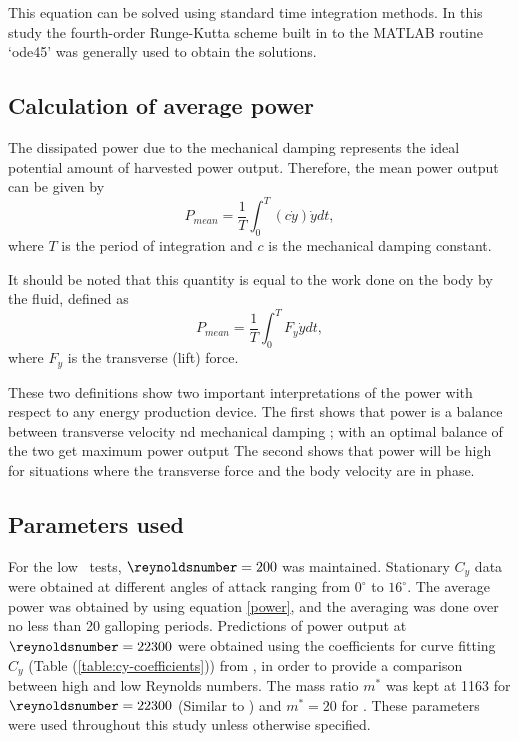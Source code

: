 This equation can be solved using standard time integration methods. In this study the fourth-order Runge-Kutta scheme built in to the MATLAB routine `ode45' was generally used to obtain the solutions. 

\subsection{Calculation of average power}

 The dissipated power due to the mechanical damping represents the ideal potential amount of harvested power output. Therefore, the mean power output can be given by
\begin{equation}
\label{power}
P_{mean}=\frac{1}{T}\int_{0}^{T}(c\dot{y})\dot{y} dt,
\end{equation}
where $T$ is the period of integration and $c$ is the mechanical damping constant. 

It should be noted that this quantity is equal to the work done on the body by the fluid, defined as
\begin{equation}
\label{power_alt}
P_{mean}=\frac{1}{T}\int_{0}^{T}F_y\dot{y} dt,
\end{equation}
where $F_y$ is the transverse (lift) force.

  These two definitions show two important interpretations of the power with respect to any energy production device. The first shows that power is a balance between transverse velocity nd mechanical damping ; with an optimal balance of the two get maximum power output The second shows that power will be high for situations where the transverse force and the body velocity are in phase.
 
 

 
 
 \subsection{Parameters used} 
  
 For the low \reynoldsnumber\ tests, $\reynoldsnumber=200$ was maintained. Stationary $C_y$ data were obtained at different angles of attack ranging from $0^\circ$ to $16^\circ$. The average power was obtained by using equation \ref{power}, and the averaging was done over no less than 20 galloping periods. Predictions of power output at $\reynoldsnumber=22300$ were obtained using the coefficients for curve fitting $C_y$ (Table (\ref{table:cy-coefficients})) from \citet{Parkinson1964}, in order to provide a comparison between high and low Reynolds numbers. The mass ratio $m^*$ was kept at 1163 for $\reynoldsnumber=22300$ (Similar to \citet{Parkinson1964}) and $m^*=20$ for . These parameters were used throughout this study unless otherwise specified. 
 
